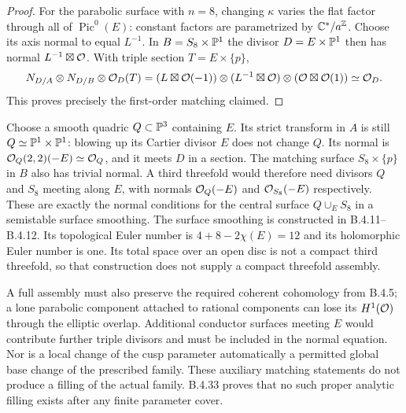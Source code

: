\begin{proof}
For the parabolic surface with $n=8$, changing $\kappa$ varies the
flat factor through all of $\operatorname{Pic}^0(E)$:
constant factors are parametrized by $\mathbb C^*/a^\mathbb Z$.
Choose its axis normal to equal $L^{-1}$.
In $B=S_8\times\mathbb P^1$ the divisor $D=E\times\mathbb P^1$ then has normal
$L^{-1}\boxtimes\mathcal O$. With triple section $T=E\times\{p\}$,
\[
 N_{D/A}\otimes N_{D/B}\otimes\mathcal O_D(T)
   =(L\boxtimes\mathcal O(-1))\otimes
     (L^{-1}\boxtimes\mathcal O)\otimes(\mathcal O\boxtimes\mathcal O(1))
   \simeq\mathcal O_D.
\]
This proves precisely the first-order matching claimed.
\end{proof}

\begin{remark}
Choose a smooth quadric $Q\subset\mathbb P^3$ containing $E$.
Its strict transform in $A$ is still $Q\simeq\mathbb P^1\times\mathbb P^1$:
blowing up its Cartier divisor $E$ does not change $Q$.
Its normal is
$\mathcal O_Q(2,2)(-E)\simeq\mathcal O_Q$, and it meets $D$ in a section.
The matching surface $S_8\times\{p\}$ in $B$ also has trivial
normal. A third threefold would therefore need divisors $Q$ and
$S_8$ meeting along $E$, with normals
$\mathcal O_Q(-E)$ and $\mathcal O_{S_8}(-E)$ respectively.
These are exactly the normal conditions for the central surface
$Q\cup_E S_8$ in a semistable surface smoothing.
The surface smoothing is constructed in B.4.11--B.4.12.
Its topological Euler number is $4+8-2\chi(E)=12$ and its
holomorphic Euler number is one. Its total space over an open
disc is not a compact third threefold, so that construction
does not supply a compact threefold assembly.

A full assembly must also preserve the required coherent cohomology
from B.4.5; a lone parabolic component attached to rational components
can lose its $H^1(\mathcal O)$ through the elliptic overlap.
Additional conductor surfaces meeting $E$ would contribute further
triple divisors and must be included in the normal equation.
Nor is a local change of the cusp parameter automatically a permitted
global base change of the prescribed family.
These auxiliary matching statements do not produce a filling
of the actual family. B.4.33 proves that no such proper analytic
filling exists after any finite parameter cover.
\end{remark}
